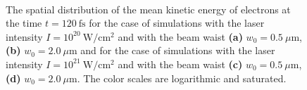 \begin{figure}[h!]
	\centering
	\\[2mm]
	\caption{The spatial distribution of the mean kinetic energy of electrons at the time $ t = 120 \ \mathrm{fs} $ for the case of simulations with the laser intensity $ I = 10^{20} \ \mathrm{W/cm^2} $ and with the beam waist \textbf{(a)} $ w_0 = 0.5 \ \mu\mathrm{m} $, \textbf{(b)} $ w_0 = 2.0 \ \mu\mathrm{m} $ and for the case of simulations with the laser intensity $ I = 10^{21} \ \mathrm{W/cm^2} $ and with the beam waist \textbf{(c)} $ w_0 = 0.5 \ \mu\mathrm{m} $, \textbf{(d)} $ w_0 = 2.0 \ \mu\mathrm{m} $. The color scales are logarithmic and saturated.}
	\label{fig:16}
\end{figure}

